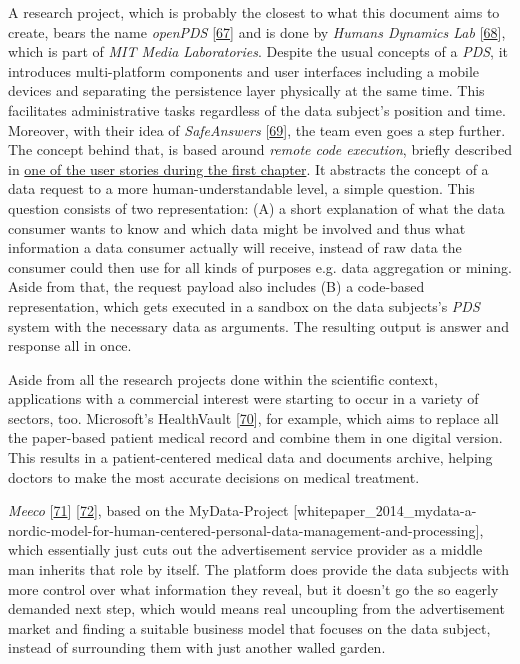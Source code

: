 \documentclass[12pt,english,a4paper,titlepage,cleardoublepage=empty,dottedtoc]{report}
\begin{document}
A research project, which is probably the closest to what this document
aims to create, bears the name \emph{openPDS}
{[}\protect\hyperlink{ref-paper_2012_openpds_on-trusted-use-of-large-scale-personal-data}{67}{]}
and is done by \emph{Humans Dynamics Lab}
{[}\protect\hyperlink{ref-web_mit_openpds-safeanswers-project-page}{68}{]},
which is part of \emph{MIT Media Laboratories}. Despite the usual
concepts of a \emph{PDS}, it introduces multi-platform components and
user interfaces including a mobile devices and separating the
persistence layer physically at the same time. This facilitates
administrative tasks regardless of the data subject's position and time.
Moreover, with their idea of \emph{SafeAnswers}
{[}\protect\hyperlink{ref-paper_2014_openpds_protecting-privacy-of-meta-data-through-safeanswers}{69}{]},
the team even goes a step further. The concept behind that, is based
around \emph{remote code execution}, briefly described in
\protect\hyperlink{header-applying-for-a-loan-and-checking-creditworthiness}{one
of the user stories during the first chapter}. It abstracts the concept
of a data request to a more human-understandable level, a simple
question. This question consists of two representation: (A) a short
explanation of what the data consumer wants to know and which data might
be involved and thus what information a data consumer actually will
receive, instead of raw data the consumer could then use for all kinds
of purposes e.g. data aggregation or mining. Aside from that, the
request payload also includes (B) a code-based representation, which
gets executed in a sandbox on the data subjects's \emph{PDS} system with
the necessary data as arguments. The resulting output is answer and
response all in once.

Aside from all the research projects done within the scientific context,
applications with a commercial interest were starting to occur in a
variety of sectors, too. Microsoft's HealthVault
{[}\protect\hyperlink{ref-web_microsoft_healthvault}{70}{]}, for
example, which aims to replace all the paper-based patient medical
record and combine them in one digital version. This results in a
patient-centered medical data and documents archive, helping doctors to
make the most accurate decisions on medical treatment.

\emph{Meeco} {[}\protect\hyperlink{ref-web_meeco_how-it-works}{71}{]}
{[}\protect\hyperlink{ref-slides_2015_meeco-case-study}{72}{]}, based on
the MyData-Project
{[}whitepaper\_2014\_mydata-a-nordic-model-for-human-centered-personal-data-management-and-processing{]},
which essentially just cuts out the advertisement service provider as a
middle man inherits that role by itself. The platform does provide the
data subjects with more control over what information they reveal, but
it doesn't go the so eagerly demanded next step, which would means real
uncoupling from the advertisement market and finding a suitable business
model that focuses on the data subject, instead of surrounding them with
just another walled garden.
\end{document}
